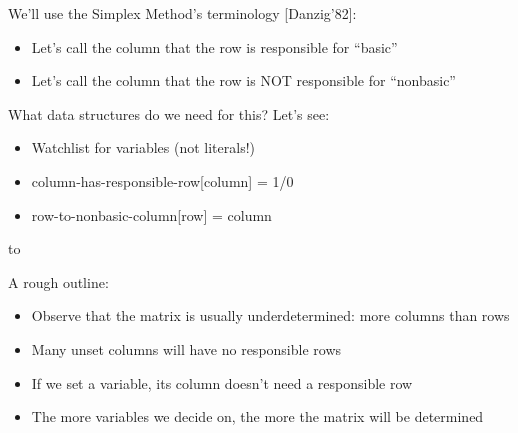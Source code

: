 \documentclass[aspectratio=196]{slides}
\def\TITLE#1{\hbox to \linewidth{\large #1\hfill}}
\def\BOTTOM{\vfill\newpage}
\def\SLIDE#1{\BOTTOM\TITLE{#1}}
\begin{document}
We'll use the Simplex Method's terminology [Danzig'82]:
\begin{itemize}
\item Let's call the column that the row is responsible for ``{\color{red}basic}''
\item Let's call the column that the row is NOT responsible for ``nonbasic''
\end{itemize}

What data structures do we need for this? Let's see:
\begin{itemize}
\item Watchlist for variables (not literals!)
\item column-has-responsible-row[column] = 1/0
\item row-to-nonbasic-column[row] = column
\end{itemize}
\vfill
\newpage
\SLIDE{CDCL(T) Gauss-Jordan Elimination: Propagation}
\vspace{2ex}

A rough outline:
\begin{itemize}
\item Observe that the matrix is usually underdetermined: more columns than rows
\item Many unset columns will have no responsible rows
\item If we set a variable, its column doesn't need a responsible row
\item The more variables we decide on, the more the matrix will be determined
\end{itemize}
\end{document}
